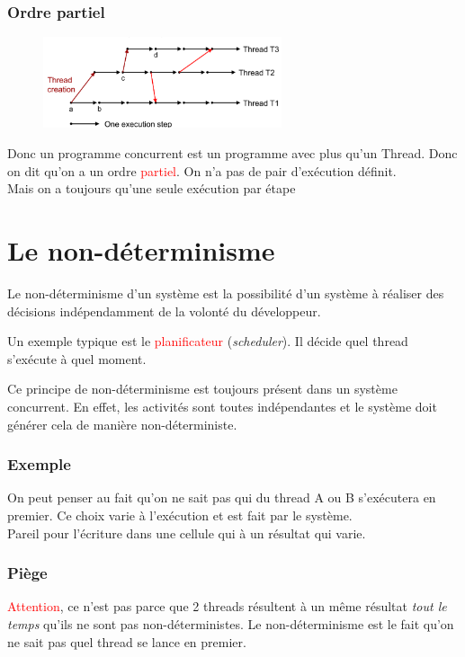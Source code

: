 \documentclass{report}
\begin{document}
\subsubsection{Ordre partiel}
\begin{figure}
\centering
\includegraphics[width=7cm]{img/ordrePartiel.png}
\end{figure}
Donc un programme concurrent est un programme avec plus qu'un Thread. Donc on dit qu'on a un ordre \textcolor{red}{partiel}. On n'a pas de pair d'exécution définit.\\
Mais on a toujours qu'une seule exécution par étape

\section{Le non-déterminisme}
Le non-déterminisme d'un système est la possibilité d'un système à réaliser des décisions indépendamment de la volonté du développeur.\par
Un exemple typique est le \textcolor{red}{planificateur} (\textit{scheduler}). Il décide quel thread s'exécute à quel moment.\par
Ce principe de non-déterminisme est toujours présent dans un système concurrent. En effet, les activités sont toutes indépendantes et le système doit générer cela de manière non-déterministe.
\subsubsection{Exemple}
On peut penser au fait qu'on ne sait pas qui du thread A ou B s'exécutera en premier. Ce choix varie à l'exécution et est fait par le système.\\
Pareil pour l'écriture dans une cellule qui à un résultat qui varie.\par

\subsubsection{Piège}
\textcolor{red}{Attention}, ce n'est pas parce que 2 threads résultent à un même résultat \textit{tout le temps} qu'ils ne sont pas non-déterministes. Le non-déterminisme est le fait qu'on ne sait pas quel thread se lance en premier.
\end{document}
